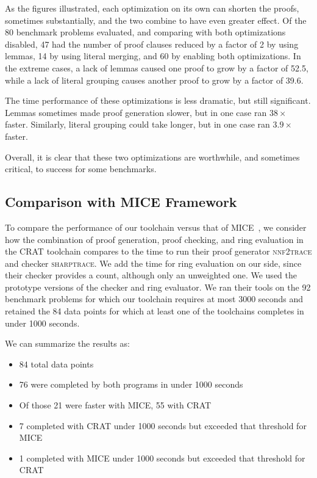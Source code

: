 \documentclass[letterpaper,USenglish,cleveref, autoref, thm-restate]{lipics-v2021}
\newcommand{\progname}[1]{\textsc{#1}}
\begin{document}
As the figures illustrated, each optimization on its own can shorten
the proofs, sometimes substantially, and the two combine to have even
greater effect.  Of the 80 benchmark problems evaluated, and comparing
with both optimizations disabled, 47 had the number of proof clauses
reduced by a factor of 2 by using lemmas, 14 by using literal merging,
and 60 by enabling both optimizations.  In the extreme cases, a lack
of lemmas caused one proof to grow by a factor of 52.5, while a lack
of literal grouping causes another proof to grow by a factor of 39.6.

The time performance of these optimizations is less dramatic, but
still significant.  Lemmas sometimes made proof generation slower, but
in one case ran $38\times$ faster.  Similarly, literal grouping could
take longer, but in one case ran $3.9\times$ faster.

Overall, it is clear that these two optimizations are worthwhile, and
sometimes critical, to success for some benchmarks.

\subsection{Comparison with MICE Framework}

To compare the performance of our toolchain versus that of
MICE~\cite{fichte:sat:2022}, we consider how the combination of proof
generation, proof checking, and ring evaluation in the CRAT toolchain compares to the time to
run their proof generator \progname{nnf2trace} and checker
\progname{sharptrace}.  We add the time for ring evaluation on our
side, since their checker provides a count, although only an
unweighted one.  We used the prototype versions of the checker and ring evaluator.
We ran their tools on the 92 benchmark problems for
which our toolchain requires at most 3000 seconds and retained
the 84 data points for which at least one of the toolchains completes in under 1000 seconds.

We can summarize the results as:
\begin{itemize}
\item 84 total data points
\item 76 were completed by both programs in under 1000 seconds
\item Of those 21 were faster with MICE, 55 with CRAT
\item 7 completed with CRAT under 1000 seconds but exceeded that threshold for MICE
\item 1 completed with MICE under 1000 seconds but exceeded that threshold for CRAT
\end{itemize}
\end{document}
